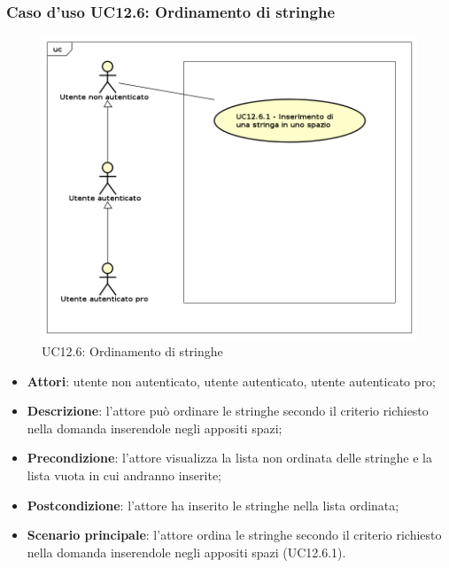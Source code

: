 \subsubsection{Caso d'uso UC12.6: Ordinamento di stringhe}
\label{UC12.6}
\begin{figure}[h]
	\centering
	\includegraphics[scale=0.5]{UML/UC12_6.png}
	\caption{UC12.6: Ordinamento di stringhe}
\end{figure}
\begin{itemize}
\item \textbf{Attori}: utente non autenticato, utente autenticato, utente autenticato pro;
\item \textbf{Descrizione}: l'attore può ordinare le stringhe secondo il criterio richiesto nella domanda inserendole negli appositi spazi;
\item \textbf{Precondizione}: l'attore visualizza la lista non ordinata delle stringhe e la lista vuota in cui andranno inserite;
\item \textbf{Postcondizione}: l'attore ha inserito le stringhe nella lista ordinata;
\item \textbf{Scenario principale}: l'attore ordina le stringhe secondo il criterio richiesto nella domanda inserendole negli appositi spazi (UC12.6.1).
\end{itemize}

\newpage
